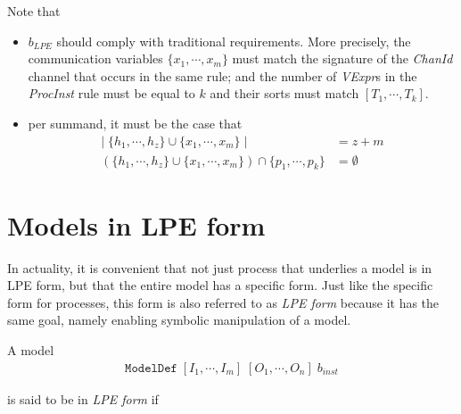 Note that
\begin{itemize}
\item $b_\textit{LPE}$ should comply with traditional \txs{} requirements.
More precisely, the communication variables $\{ x_1, \cdots{}, x_m \}$ must match the signature of the \textit{ChanId} channel that occurs in the same rule; and the number of \textit{VExpr}s in the \textit{ProcInst} rule must be equal to $k$ and their sorts must match $[T_1, \cdots{}, T_k]$.
\item per summand, it must be the case that
\begin{align*}
|\; \{ h_1, \cdots{}, h_z \} \cup \{ x_1, \cdots{}, x_m \} \; | &= z + m \\
(\{ h_1, \cdots{}, h_z \} \cup \{ x_1, \cdots{}, x_m \}) \cap \{ p_1, \cdots{}, p_k \} &= \emptyset{}
\end{align*}
\end{itemize}

\section{Models in LPE form} \label{modellpeform}

In actuality, it is convenient that not just process that underlies a model is in LPE form, but that the entire model has a specific form.
Just like the specific form for processes, this form is also referred to as \emph{LPE form} because it has the same goal, namely enabling symbolic manipulation of a model.

A \txs{} model
\begin{align*}
\texttt{ModelDef} \; [I_1, \cdots{}, I_m] \; [O_1, \cdots{}, O_n] \; b_\textit{inst}
\end{align*}

is said to be in \emph{LPE form} if

